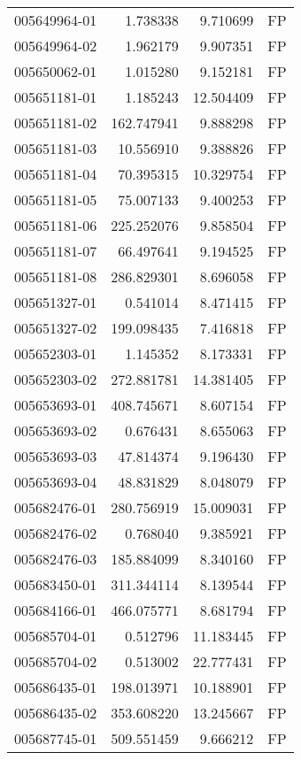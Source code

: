 \begin{tabular}{lrrl}
005649964-01 &    1.738338 &     9.710699 &   FP \\
005649964-02 &    1.962179 &     9.907351 &   FP \\
005650062-01 &    1.015280 &     9.152181 &   FP \\
005651181-01 &    1.185243 &    12.504409 &   FP \\
005651181-02 &  162.747941 &     9.888298 &   FP \\
005651181-03 &   10.556910 &     9.388826 &   FP \\
005651181-04 &   70.395315 &    10.329754 &   FP \\
005651181-05 &   75.007133 &     9.400253 &   FP \\
005651181-06 &  225.252076 &     9.858504 &   FP \\
005651181-07 &   66.497641 &     9.194525 &   FP \\
005651181-08 &  286.829301 &     8.696058 &   FP \\
005651327-01 &    0.541014 &     8.471415 &   FP \\
005651327-02 &  199.098435 &     7.416818 &   FP \\
005652303-01 &    1.145352 &     8.173331 &   FP \\
005652303-02 &  272.881781 &    14.381405 &   FP \\
005653693-01 &  408.745671 &     8.607154 &   FP \\
005653693-02 &    0.676431 &     8.655063 &   FP \\
005653693-03 &   47.814374 &     9.196430 &   FP \\
005653693-04 &   48.831829 &     8.048079 &   FP \\
005682476-01 &  280.756919 &    15.009031 &   FP \\
005682476-02 &    0.768040 &     9.385921 &   FP \\
005682476-03 &  185.884099 &     8.340160 &   FP \\
005683450-01 &  311.344114 &     8.139544 &   FP \\
005684166-01 &  466.075771 &     8.681794 &   FP \\
005685704-01 &    0.512796 &    11.183445 &   FP \\
005685704-02 &    0.513002 &    22.777431 &   FP \\
005686435-01 &  198.013971 &    10.188901 &   FP \\
005686435-02 &  353.608220 &    13.245667 &   FP \\
005687745-01 &  509.551459 &     9.666212 &   FP \\

\end{tabular}
